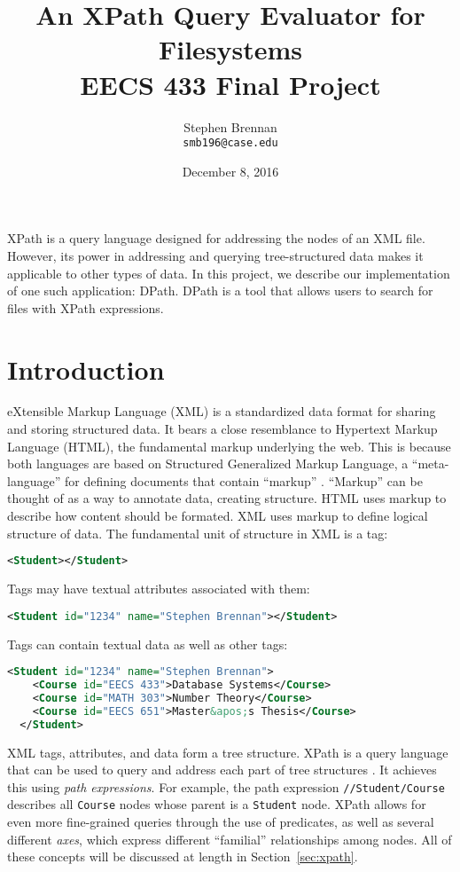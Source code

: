 \documentclass{article}
\title{An XPath Query Evaluator for Filesystems \\ EECS 433 Final Project}
\date{December 8, 2016}
\author{Stephen Brennan \\ \texttt{smb196@case.edu}}
\begin{document}
\maketitle

\abstract

XPath is a query language designed for addressing the nodes of an XML file.
However, its power in addressing and querying tree-structured data makes it
applicable to other types of data. In this project, we describe our
implementation of one such application: DPath. DPath is a tool that allows users
to search for files with XPath expressions.

\section{Introduction}

eXtensible Markup Language (XML) is a standardized data format for sharing and
storing structured data. It bears a close resemblance to Hypertext Markup
Language (HTML), the fundamental markup underlying the web. This is because both
languages are based on Structured Generalized Markup Language, a
``meta-language'' for defining documents that contain ``markup'' \cite{sgml}.
``Markup'' can be thought of as a way to annotate data, creating structure. HTML
uses markup to describe how content should be formated. XML uses markup to
define logical structure of data. The fundamental unit of structure in XML is a
tag:

\begin{lstlisting}[language=XML]
  <Student></Student>
\end{lstlisting}

Tags may have textual attributes associated with them:

\begin{lstlisting}[language=XML]
  <Student id="1234" name="Stephen Brennan"></Student>
\end{lstlisting}

Tags can contain textual data as well as other tags:

\begin{lstlisting}[language=XML]
  <Student id="1234" name="Stephen Brennan">
    <Course id="EECS 433">Database Systems</Course>
    <Course id="MATH 303">Number Theory</Course>
    <Course id="EECS 651">Master&apos;s Thesis</Course>
  </Student>
\end{lstlisting}

XML tags, attributes, and data form a tree structure. XPath is a query language
that can be used to query and address each part of tree structures \cite{xpath}.
It achieves this using \emph{path expressions}. For example, the path expression
\texttt{//Student/Course} describes all \texttt{Course} nodes whose parent is a
\texttt{Student} node. XPath allows for even more fine-grained queries through
the use of predicates, as well as several different \emph{axes}, which express
different ``familial'' relationships among nodes. All of these concepts will be
discussed at length in Section~\ref{sec:xpath}.
\end{document}
